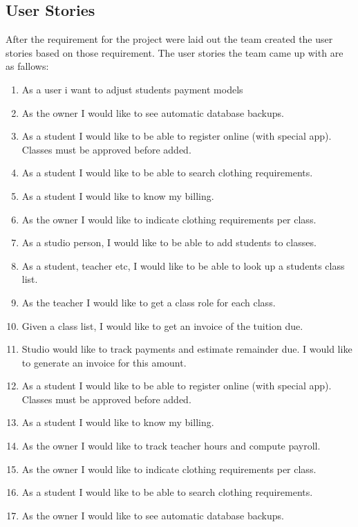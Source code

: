 \subsection{User Stories}

After the requirement for the project were laid out the team created the user stories based on those requirement. The user stories the team came up with are as fallows:

\begin{enumerate}
  \item As a user i want to adjust students payment models
  \item As the owner I would like to see automatic database backups.
  \item As a student I would like to be able to register online (with special app). Classes must be approved before added.
  \item As a student I would like to be able to search clothing requirements.
  \item As a student I would like to know my billing.
  \item As the owner I would like to indicate clothing requirements per class.
  \item As a studio person, I would like to be able to add students to classes.
  \item  As a student, teacher etc, I would like to be able to look up a students class list.
  \item As the teacher I would like to get a class role for each class.
  \item Given a class list, I would like to get an invoice of the tuition due.
  \item Studio would like to track payments and estimate remainder due.  I would like to generate an invoice for this amount.
  \item As a student I would like to be able to register online (with special app).   Classes must be approved before added.
  \item As a student I would like to know my billing.
  \item As the owner I would like to track teacher hours and compute payroll.
  \item As the owner I would like to indicate clothing requirements per class.
  \item As a student I would like to be able to search clothing requirements.
  \item As the owner I would like to see automatic database backups.
\end{enumerate}

